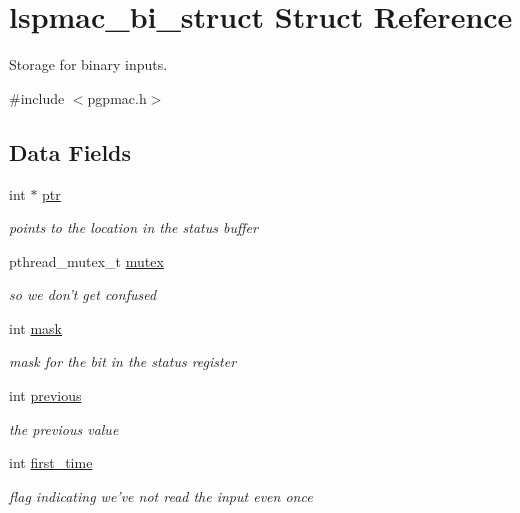 \hypertarget{structlspmac__bi__struct}{\section{lspmac\-\_\-bi\-\_\-struct Struct Reference}
\label{structlspmac__bi__struct}
}


Storage for binary inputs.  




{\ttfamily \#include $<$pgpmac.\-h$>$}

\subsection*{Data Fields}
\begin{DoxyCompactItemize}
\item 
int $\ast$ \hyperlink{structlspmac__bi__struct_ae201bf05130bcb6985704ea42efabeb3}{ptr}
\begin{DoxyCompactList}\small\item\em points to the location in the status buffer \end{DoxyCompactList}\item 
pthread\-\_\-mutex\-\_\-t \hyperlink{structlspmac__bi__struct_a58053a98fa4696b56d674e775b3b4690}{mutex}
\begin{DoxyCompactList}\small\item\em so we don't get confused \end{DoxyCompactList}\item 
int \hyperlink{structlspmac__bi__struct_ac010058c9883088705059dee1d90ee72}{mask}
\begin{DoxyCompactList}\small\item\em mask for the bit in the status register \end{DoxyCompactList}\item 
int \hyperlink{structlspmac__bi__struct_a00f09cb3d7bdbe1058fb56bb8c2b0fa3}{previous}
\begin{DoxyCompactList}\small\item\em the previous value \end{DoxyCompactList}\item 
int \hyperlink{structlspmac__bi__struct_a814978c33dc99e7911faa4ddb12bfd90}{first\-\_\-time}
\begin{DoxyCompactList}\small\item\em flag indicating we've not read the input even once \end{DoxyCompactList}\item 

\end{DoxyCompactItemize}
